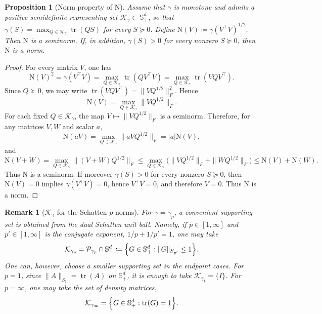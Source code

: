 \documentclass{article}
\newtheorem{proposition}[theorem]{Proposition}
\newtheorem{remark}[theorem]{Remark}
\newcommand{\mN}{\mathrm{N}}
\newcommand{\tr}{\operatorname{tr}}
\newcommand{\cK}{\mathcal K_\gamma}
\begin{document}
\begin{proposition}[Norm property of $\mN$]\label{prop:N-norm}
Assume that $\gamma$ is monotone and admits a positive semidefinite
representing set $\cK\subset\mathbb S_+^d$, so that
$\gamma(S)=\max_{Q\in\cK}\tr(QS)$ for every $S\succeq0$. Define
$\mN(V)\coloneqq\gamma(V^\top V)^{1/2}$. Then $\mN$ is a seminorm. If, in
addition, $\gamma(S)>0$ for every nonzero $S\succeq0$, then $\mN$ is a norm.
\end{proposition}

\begin{proof}
For every matrix $V$, one has
\[
    \mN(V)^2
    =
    \gamma(V^\top V)
    =
    \max_{Q\in\cK}\tr(QV^\top V)
    =
    \max_{Q\in\cK}\tr(VQV^\top).
\]
Since $Q\succeq0$, we may write
$\tr(VQV^\top)=\|VQ^{1/2}\|_F^2$. Hence
\[
    \mN(V)
    =
    \max_{Q\in\cK}\|VQ^{1/2}\|_F.
\]
For each fixed $Q\in\cK$, the map $V\mapsto\|VQ^{1/2}\|_F$ is a seminorm.
Therefore, for any matrices $V,W$ and scalar $a$,
\[
    \mN(aV)
    =
    \max_{Q\in\cK}\|aVQ^{1/2}\|_F
    =
    |a|\mN(V),
\]
and
\[
    \mN(V+W)
    =
    \max_{Q\in\cK}\|(V+W)Q^{1/2}\|_F
    \le
    \max_{Q\in\cK}
    \bigl(\|VQ^{1/2}\|_F+\|WQ^{1/2}\|_F\bigr)
    \le
    \mN(V)+\mN(W).
\]
Thus $\mN$ is a seminorm. If moreover $\gamma(S)>0$ for every nonzero
$S\succeq0$, then $\mN(V)=0$ implies $\gamma(V^\top V)=0$, hence
$V^\top V=0$, and therefore $V=0$. Thus $\mN$ is a norm.
\end{proof}


\begin{remark}[$\mathcal K_\gamma$ for the Schatten $p$-norms]\label{rem-kgamma-shatten}
For $\gamma=\gamma_p$, a convenient supporting set is obtained from the dual
Schatten unit ball. Namely, if $p\in[1,\infty]$ and $p'\in[1,\infty]$ is the
conjugate exponent, $1/p+1/p'=1$, one may take
\[
    \mathcal K_{\gamma_p}
    =
    \mathcal P_{\gamma_p}\cap\mathbb S_+^d
    \coloneqq
    \Bigl\{
        G\in\mathbb S_+^d:
        \|G\|_{S_{p'}}\leq 1
    \Bigr\}.
\]
One can, however, choose a smaller supporting set in the endpoint cases.
For $p=1$, since $\|A\|_{S_1}=\operatorname{tr}(A)$ on $\mathbb S_+^d$, it is
enough to take $\mathcal K_{\gamma_1}=\{I\}$. For $p=\infty$, one may take the
set of density matrices,
\[
    \mathcal K_{\gamma_\infty}
    =
    \Bigl\{
        G\in\mathbb S_+^d:
        \operatorname{tr}(G)=1
    \Bigr\}.
\]
\end{remark}
\end{document}
